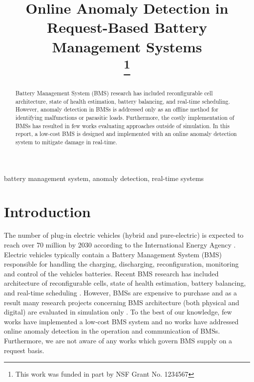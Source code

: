 \documentclass[11pt,conference,draftcls,onecolumn]{IEEEtran}
\begin{document}
\title{Online Anomaly Detection in Request-Based Battery Management Systems\\
{}
\thanks{This work was funded in part by NSF Grant No. 1234567}
}

\author{
\and
{}
}

\maketitle

\begin{abstract}
Battery Management System (BMS) research has included reconfigurable cell architecture, state of health estimation, battery balancing, and real-time scheduling.
However, anomaly detection in BMSs is addressed only as an offline method for identifying malfunctions or parasitic loads.
Furthermore, the costly implementation of BMSs has resulted in few works evaluating approaches outside of simulation.
In this report, a low-cost BMS is designed and implemented with an online anomaly detection system to mitigate damage in real-time.   
\end{abstract}

\begin{IEEEkeywords}
battery management system, anomaly detection, real-time systems
\end{IEEEkeywords}

\section{Introduction}
The number of plug-in electric vehicles (hybrid and pure-electric) is expected to reach over 70 million by 2030 according to the International Energy Agency \cite{iea}.
Electric vehicles typically contain a Battery Management System (BMS) responsible for handling the charging, discharging, reconfiguration, monitoring and control of the vehicles batteries.
Recent BMS research has included architecture of reconfigurable cells, state of health estimation, battery balancing, and real-time scheduling
\cite{batteryAwareDynamicSchedulingForPeriodicTaskGraphs,realTimePredictionOfBatteryPowerRequirements,reconfigurableBatteryTechniquesAndSystems}.
However, BMSs are expensive to purchase and as a result many research projects concerning BMS architecture (both physical and digital) are evaluated in simulation only \cite{towardsSmarterBatteryDesign}.
To the best of our knowledge, few works have implemented a low-cost BMS system and no works have addressed online anomaly detection in the operation and communication of BMSs.
Furthermore, we are not aware of any works which govern BMS supply on a request basis.
\end{document}
